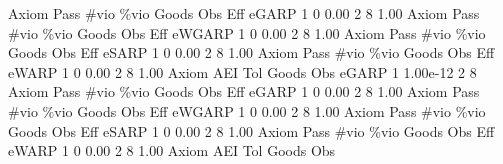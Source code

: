        Axiom {\VBAR} Pass        \#vio        \%vio       Goods         Obs         Eff  
       eGARP {\VBAR}    1           0        0.00           2           8        1.00  
{\smallskip}
{\smallskip}
{\smallskip}
       Axiom {\VBAR} Pass        \#vio        \%vio       Goods         Obs         Eff  
      eWGARP {\VBAR}    1           0        0.00           2           8        1.00  
{\smallskip}
{\smallskip}
{\smallskip}
       Axiom {\VBAR} Pass        \#vio        \%vio       Goods         Obs         Eff  
       eSARP {\VBAR}    1           0        0.00           2           8        1.00  
{\smallskip}
{\smallskip}
{\smallskip}
       Axiom {\VBAR} Pass        \#vio        \%vio       Goods         Obs         Eff  
       eWARP {\VBAR}    1           0        0.00           2           8        1.00  
{\smallskip}
       Axiom {\VBAR}       AEI        Tol      Goods        Obs 
       eGARP {\VBAR}         1   1.00e-12          2          8 
{\smallskip}
{\smallskip}
{\smallskip}
       Axiom {\VBAR} Pass        \#vio        \%vio       Goods         Obs         Eff  
       eGARP {\VBAR}    1           0        0.00           2           8        1.00  
{\smallskip}
{\smallskip}
{\smallskip}
       Axiom {\VBAR} Pass        \#vio        \%vio       Goods         Obs         Eff  
      eWGARP {\VBAR}    1           0        0.00           2           8        1.00  
{\smallskip}
{\smallskip}
{\smallskip}
       Axiom {\VBAR} Pass        \#vio        \%vio       Goods         Obs         Eff  
       eSARP {\VBAR}    1           0        0.00           2           8        1.00  
{\smallskip}
{\smallskip}
{\smallskip}
       Axiom {\VBAR} Pass        \#vio        \%vio       Goods         Obs         Eff  
       eWARP {\VBAR}    1           0        0.00           2           8        1.00  
{\smallskip}
       Axiom {\VBAR}       AEI        Tol      Goods        Obs 
